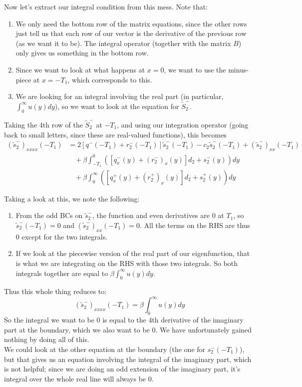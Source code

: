 \documentclass[12pt]{article}
\begin{document}
Now let's extract our integral condition from this mess. Note that:
\begin{enumerate}
	\item We only need the bottom row of the matrix equations, since the other rows just tell us that each row of our vector is the derivative of the previous row (as we want it to be). The integral operator (together with the matrix $B$) only gives us something in the bottom row.
	\item Since we want to look at what happens at $x = 0$, we want to use the minus-piece at $x = -T_1$, which corresponds to this.
	\item We are looking for an integral involving the real part (in particular, $\int_0^\infty u(y) dy$), so we want to look at the equation for $\tilde{S}_2^-$.
\end{enumerate}

Taking the 4th row of the $\tilde{S}_2^-$ at $-T_1$, and using our integration operator (going back to small letters, since these are real-valued functions), this becomes
\begin{align*}
(\tilde{s}_2^-)_{xxxx}(-T_1) &= 2[ q^-(-T_1) + r_2^-(-T_1)]\tilde{s}_2^-(-T_1) - c_2 \tilde{s}_2^-(-T_1) + (\tilde{s}_2^-)_{xx}(-T_1) \\
&\:\:\:\: + \beta \int_{-T_1}^0 ([q^-_x(y) + (r_2^-)_x(y)]d_2 + s_2^-(y))dy \\
&\:\:\:\: + \beta \int_0^\infty ([q^+_x(y) + (r_2^+)_x(y)]d_2 + s_2^+(y))dy 
\end{align*}

Taking a look at this, we note the following:
\begin{enumerate}
	\item From the odd BCs on $\tilde{s}_2^-$, the function and even derivatives are 0 at $T_1$, so $\tilde{s}_2^-(-T_1) = 0$ and $(\tilde{s}_2^-)_{xx}(-T_1) = 0$. All the terms on the RHS are thus 0 except for the two integrals.
	\item If we look at the piecewise version of the real part of our eigenfunction, that is what we are integrating on the RHS with those two integrals. So both integrals together are equal to $\beta \int_0^\infty u(y) dy$.
\end{enumerate}
Thus this whole thing reduces to:
\[
(\tilde{s}_2^-)_{xxxx}(-T_1) = \beta \int_0^\infty u(y) dy
\]
So the integral we want to be 0 is equal to the 4th derivative of the imaginary part at the boundary, which we also want to be 0. We have unfortunately gained nothing by doing all of this.\\

We could look at the other equation at the boundary (the one for $s_2^-(-T_1)$), but that gives us an equation involving the integral of the imaginary part, which is not helpful; since we are doing an odd extension of the imaginary part, it's integral over the whole real line will always be 0.
\end{document}
